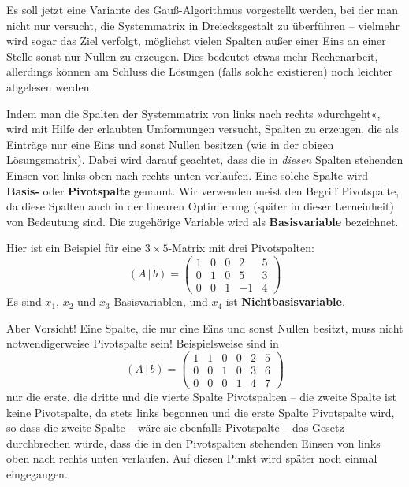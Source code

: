 
Es soll jetzt eine Variante des Gauß-Algorithmus vorgestellt werden, bei der man nicht nur versucht, die Systemmatrix in Dreiecksgestalt zu überführen -- vielmehr wird sogar das Ziel verfolgt, möglichst vielen Spalten außer einer Eins an einer Stelle sonst nur Nullen zu erzeugen. Dies bedeutet etwas mehr Rechenarbeit, allerdings können am Schluss die Lösungen (falls solche existieren) noch leichter abgelesen werden.

Indem man die Spalten der Systemmatrix von links nach rechts »durchgeht«, wird mit Hilfe der erlaubten Umformungen versucht, Spalten zu erzeugen, die als Einträge nur eine Eins und sonst Nullen besitzen (wie in der obigen Lösungsmatrix). Dabei wird darauf geachtet, dass die in \emph{diesen} Spalten stehenden Einsen von links oben nach rechts unten verlaufen. Eine solche Spalte wird \textbf{Basis-} oder \textbf{Pivotspalte} genannt. Wir verwenden meist den Begriff Pivotspalte, da diese Spalten auch in der linearen Optimierung (später in dieser Lerneinheit) von Bedeutung sind. Die zugehörige Variable wird als \textbf{Basisvariable} bezeichnet.

Hier ist ein Beispiel für eine $3 \times 5$-Matrix mit drei Pivotspalten:
\[ (A\,|\,b) = \left(\begin{array}{cccc|c} 1 & 0 & 0 & 2 & 5\\ 0 & 1 & 0 & 5 & 3\\ 0 & 0 & 1 & -1 & 4 \end{array}\right) \]
Es sind $x_1$, $x_2$ und $x_3$ Basisvariablen, und $x_4$ ist \textbf{Nichtbasisvariable}.

Aber Vorsicht! Eine Spalte, die nur eine Eins und sonst Nullen besitzt, muss nicht notwendigerweise Pivotspalte sein! Beispielsweise sind in
\[ (A\,|\,b) = \left(\begin{array}{cccccc|c} 1 & 1 & 0 & 0 & 2 & 5\\ 0 & 0 & 1 & 0 & 3 & 6\\ 0 & 0 & 0 & 1 & 4 & 7 \end{array}\right) \]
nur die erste, die dritte und die vierte Spalte Pivotspalten -- die zweite Spalte ist keine Pivotspalte, da stets links begonnen und die erste Spalte Pivotspalte wird, so dass die zweite Spalte -- wäre sie ebenfalls Pivotspalte -- das Gesetz durchbrechen würde, dass die in den Pivotspalten stehenden Einsen von links oben nach rechts unten verlaufen. Auf diesen Punkt wird später noch einmal eingegangen.

